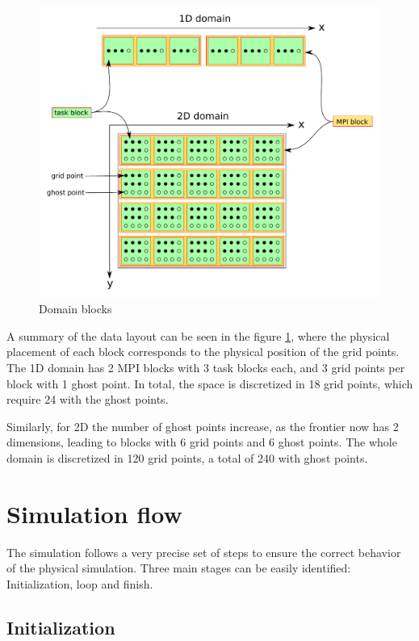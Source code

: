 \documentclass[a4paper]{report}
\begin{document}
\begin{figure}[h]
	\centering
	\includegraphics[width=\linewidth]{domain-blocks.pdf}
	\caption{Domain blocks}
	\label{fig:domain-blocks}
\end{figure}

A summary of the data layout can be seen in the figure \ref{fig:domain-blocks}, 
where the physical placement of each block corresponds to the physical position 
of the grid points. The 1D domain has 2 MPI blocks with 3 task blocks each, and 
3 grid points per block with 1 ghost point. In total, the space is discretized 
	in 18 grid points, which require 24 with the ghost points.

Similarly, for 2D the number of ghost points increase, as the frontier now has 2 
dimensions, leading to blocks with 6 grid points and 6 ghost points. The whole 
domain is discretized in 120 grid points, a total of 240 with ghost points.

\section{Simulation flow}

The simulation follows a very precise set of steps to ensure the correct 
behavior of the physical simulation. Three main stages can be easily identified: 
Initialization, loop and finish.

\subsection{Initialization}
\end{document}
